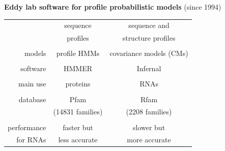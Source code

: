 \documentclass[landscape]{slides}
\begin{document}
\begin{slide}
\begin{center}
\textbf{Eddy lab software for profile probabilistic models } (since 1994)
\end{center}
\medskip

\begin{center}
\small
\begin{tabular}{r|cc} 
             & sequence & sequence and \\
             & profiles & structure profiles \\ \hline
  \\
  models     & profile HMMs     & {\color{red} covariance models (CMs)} \\ 
  \\
  software   & {\sc HMMER}      & {\sc Infernal} \\ 
  \\
  main use   & proteins         & RNAs \\ 
  \\
  database   & {\sc Pfam}       & {\sc Rfam} \\
             & (14831 families) & (2208 families) \\
  \\
  performance& faster but    & slower but    \\
  for RNAs   & less accurate & more accurate \\
\end{tabular}


\end{center}
\end{slide}
\end{document}
